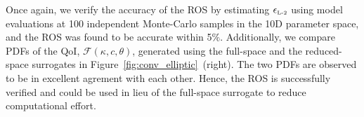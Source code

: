 Once again, we verify the accuracy of the ROS by estimating $\epsilon_{\mbox{\tiny{L-2}}}$
using model evaluations at 100 independent Monte-Carlo samples in the 10D parameter
space, and the ROS was found to be accurate
within 5$\%$. 
Additionally, we compare PDFs of the QoI, $\mathcal{F}(\kappa,c,\theta)$,
generated using the full-space and the reduced-space surrogates in
Figure~\ref{fig:conv_elliptic}~(right). The two PDFs are observed to be in
excellent agrement with each other. Hence, the ROS is successfully verified and
could be used in lieu of the full-space surrogate to reduce computational
effort. 
































